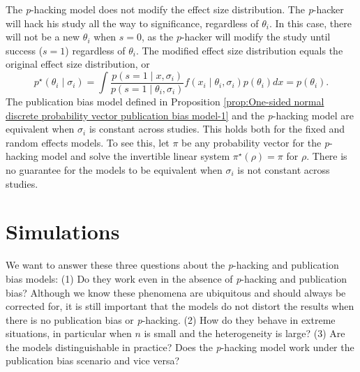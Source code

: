\documentclass[useAMS,usenatbib,referee]{biom}
\begin{document}
The \textit{p}-hacking model does not modify the effect size distribution. The \textit{p}-hacker will hack his study all the way to significance, regardless of $\theta_i$. In this case, there will not be a new $\theta_i$ when $s=0$, as the $p$-hacker will modify the study until success ($s=1$) regardless of $\theta_i$. The modified effect size distribution equals the original effect size distribution, or
\[
p^\star(\theta_i\mid \sigma_i)=\int\frac{p(s=1\mid x, \sigma_i)}{p(s=1\mid \theta_i, \sigma_i)}f(x_i \mid \theta_i, \sigma _i) p(\theta_i)dx = p(\theta_i).
\]
The publication bias model defined in Proposition \ref{prop:One-sided normal discrete probability vector publication bias model-1} and the \textit{p}-hacking model are equivalent when $\sigma_{i}$ is constant across studies. This holds both for the fixed and random effects models. To see this, let $\pi$ be any probability vector for the \textit{p}-hacking model and solve the invertible linear system $\pi^{\star}(\rho)=\pi$ for $\rho$. There is no guarantee for the models to be equivalent when $\sigma_{i}$ is not constant across studies. 
\section{Simulations}\label{sect:simulations}

We want to answer these three questions about the \textit{p}-hacking and publication bias models: (1) Do they work even in the absence of \textit{p}-hacking and publication bias? Although we know these phenomena are ubiquitous and should always be corrected for, it is still important that the models do not distort the results when there is no publication bias or \textit{p}-hacking. (2) How do they behave in extreme situations, in particular when $n$ is small and the heterogeneity is large? (3) Are the models distinguishable in practice? Does the \textit{p}-hacking model work under the publication bias scenario and vice versa?
\end{document}
